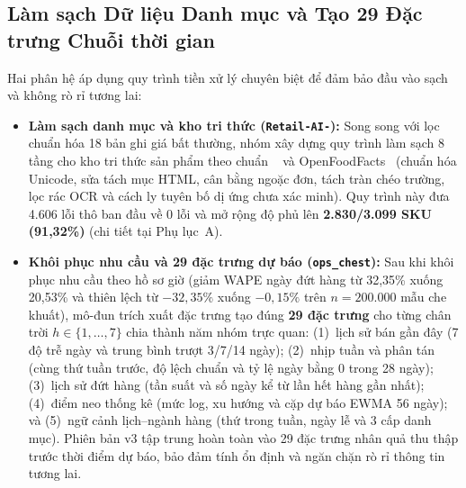 \subsection*{Làm sạch Dữ liệu Danh mục và Tạo 29 Đặc trưng Chuỗi thời gian}
Hai phân hệ áp dụng quy trình tiền xử lý chuyên biệt để đảm bảo đầu vào sạch và không rò rỉ tương lai:
\begin{itemize}
    \item \textbf{Làm sạch danh mục và kho tri thức (\texttt{Retail-AI-}):} Song song với lọc chuẩn hóa 18 bản ghi giá bất thường, nhóm xây dựng quy trình làm sạch 8 tầng cho kho tri thức sản phẩm theo chuẩn ~\cite{hf_datatrove} và OpenFoodFacts~\cite{openfoodfacts} (chuẩn hóa Unicode, sửa tách mục HTML, cân bằng ngoặc đơn, tách tràn chéo trường, lọc rác OCR và cách ly tuyên bố dị ứng chưa xác minh). Quy trình này đưa 4.606 lỗi thô ban đầu về 0 lỗi và mở rộng độ phủ lên \textbf{2.830/3.099 SKU (91,32\%)} (chi tiết tại Phụ lục~A).
    \item \textbf{Khôi phục nhu cầu và 29 đặc trưng dự báo (\texttt{ops\_chest}):} Sau khi khôi phục nhu cầu theo hồ sơ giờ (giảm WAPE ngày đứt hàng từ 32,35\% xuống 20,53\% và thiên lệch từ $-32{,}35\%$ xuống $-0{,}15\%$ trên $n=200.000$ mẫu che khuất), mô-đun trích xuất đặc trưng tạo đúng \textbf{29 đặc trưng} cho từng chân trời $h \in \{1,\dots,7\}$ chia thành năm nhóm trực quan: (1)~lịch sử bán gần đây (7 độ trễ ngày và trung bình trượt 3/7/14 ngày); (2)~nhịp tuần và phân tán (cùng thứ tuần trước, độ lệch chuẩn và tỷ lệ ngày bằng 0 trong 28 ngày); (3)~lịch sử đứt hàng (tần suất và số ngày kể từ lần hết hàng gần nhất); (4)~điểm neo thống kê (mức log, xu hướng và cặp dự báo EWMA 56 ngày); và (5)~ngữ cảnh lịch--ngành hàng (thứ trong tuần, ngày lễ và 3 cấp danh mục). Phiên bản v3 tập trung hoàn toàn vào 29 đặc trưng nhân quả thu thập trước thời điểm dự báo, bảo đảm tính ổn định và ngăn chặn rò rỉ thông tin tương lai.
\end{itemize}

